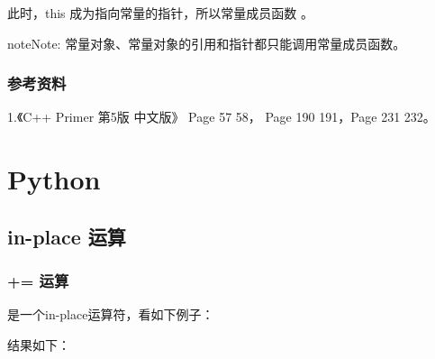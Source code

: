 \documentclass[letterpaper,10pt,english]{sphinxmanual}
\begin{document}
此时，this 成为指向常量的指针，所以常量成员函数  。

\begin{sphinxadmonition}{note}{Note:}
常量对象、常量对象的引用和指针都只能调用常量成员函数。
\end{sphinxadmonition}


\subsection{参考资料}
\label{\detokenize{cpp/22_const:id3}}
1.《C++ Primer 第5版 中文版》 Page 57 \textendash{} 58， Page 190 \textendash{} 191，Page 231 \textendash{} 232。


\chapter{Python}
\label{\detokenize{python/index:python}}\label{\detokenize{python/index::doc}}

\section{in-place 运算}
\label{\detokenize{python/01_inplace:in-place}}\label{\detokenize{python/01_inplace::doc}}

\subsection{+= 运算}
\label{\detokenize{python/01_inplace:id1}}
\sphinxcode{\sphinxupquote{+=}} 是一个in-place运算符，看如下例子：

%
\begin{sphinxVerbatim}[commandchars=\\\{\},numbers=left,firstnumber=1,stepnumber=1]
  \PYG{p}{[}\PYG{p}{]}
  
  \PYG{p}{[}\PYG{p}{]}
\end{sphinxVerbatim}

结果如下：

%
\begin{sphinxVerbatim}[commandchars=\\\{\}]
 
 
\end{sphinxVerbatim}
\end{document}

